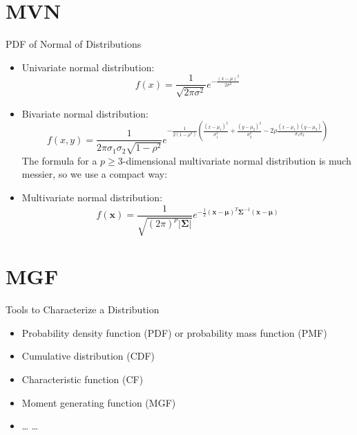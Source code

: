 \documentclass[
  ignorenonframetext,
]{beamer}
\providecommand{\tightlist}{%
  \setlength{\itemsep}{0pt}\setlength{\parskip}{0pt}}
\begin{document}
\hypertarget{mvn}{%
\section{MVN}\label{mvn}}

\begin{frame}{PDF of Normal of Distributions}
\protect\hypertarget{pdf-of-normal-of-distributions}{}
\begin{itemize}
\item
  Univariate normal distribution: \[
    f(x) = \frac{1}{\sqrt{2\pi\sigma^2}} e^{ -\frac{(x - \mu)^2}{2\sigma^2} }
    \]
\item
  Bivariate normal distribution: \[
    f(x, y) = \frac{1}{2\pi\sigma_1\sigma_2\sqrt{1-\rho^2}} e^{ -\frac{1}{2(1-\rho^2)} \left(\frac{(x - \mu_1)^2}{\sigma_1^2} + \frac{(y - \mu_2)^2}{\sigma_2^2} - 2\rho\frac{(x - \mu_1)(y - \mu_2)}{\sigma_1\sigma_2} \right)}
    \] The formula for a \(p\ge 3\)-dimensional multivariate normal
  distribution is much messier, so we use a compact way:
\item
  Multivariate normal distribution: \[
    f(\mathbf{x}) = \frac{1}{\sqrt{(2\pi)^p|\boldsymbol\Sigma|}} e^{ -\frac{1}{2} (\mathbf{x} - \boldsymbol\mu)^T \boldsymbol\Sigma^{-1} (\mathbf{x} - \boldsymbol\mu)}
    \]
\end{itemize}
\end{frame}

\hypertarget{mgf}{%
\section{MGF}\label{mgf}}

\begin{frame}{Tools to Characterize a Distribution}
\protect\hypertarget{tools-to-characterize-a-distribution}{}
\begin{itemize}
\tightlist
\item
  Probability density function (PDF) or probability mass function (PMF)
\item
  Cumulative distribution (CDF)
\item
  Characteristic function (CF)
\item
  Moment generating function (MGF)
\item
  \ldots{} \ldots{}
\end{itemize}
\end{frame}
\end{document}
